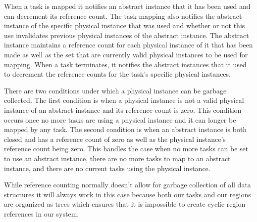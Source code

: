 When a task is mapped it notifies an abstract instance that it has been used and can
decrement its reference count.  The task mapping also notifies the abstract instance
of the specific physical instance that was used and whether or not this use invalidates
previous physical instances of the abstract instance.  The abstract instance maintains
a reference count for each physical instance of it that has been made as well as
the set that are currently valid physical instances to be used for mapping.  When a 
task terminates, it notifies the abstract instances that it used to decrement the
reference counts for the task's specific physical instances.

There are two conditions under which a physical instance can be garbage collected.  The
first condition is when a physical instance is not a valid physical instance of
an abstract instance and its reference count is zero.  This condition occurs once no
more tasks are using a physical instance and it can longer be mapped by any task.  The
second condition is when an abstract instance is both closed and has a reference count
of zero as well as the physical instance's reference count being zero.  This handles the
case when no more tasks can be set to use an abstract instance, there are no more tasks
to map to an abstract instance, and there are no current tasks using the physical
instance.

While reference counting normally doesn't allow for garbage collection of all data structures
it will always work in this case because both our tasks and our regions are organized as 
trees which ensures that it is impossible to create cyclic region references in our system.


